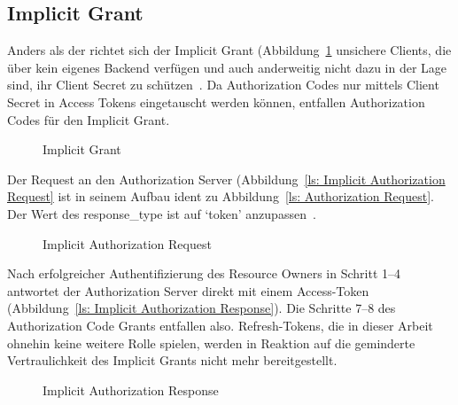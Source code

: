 \subsection{Implicit Grant}\label{ssec:implicit}
Anders als der  richtet sich der Implicit Grant
(Abbildung~\ref{fig: Implicit Grant} unsichere Clients, die über kein eigenes
Backend verfügen und auch anderweitig nicht dazu in der Lage sind, ihr Client
Secret zu schützen~. Da Authorization Codes nur
mittels Client Secret in Access Tokens eingetauscht werden können, entfallen
Authorization Codes für den Implicit Grant.
\begin{figure}[h]
    \scalebox{.5} {
        
    }
    \caption{Implicit Grant~\protect{}}\label{fig: Implicit Grant}
\end{figure} \noindent
Der Request an den Authorization Server (Abbildung~\ref{ls: Implicit
Authorization Request} ist in seinem Aufbau ident zu Abbildung~\ref{ls:
Authorization Request}. Der Wert des response\_type ist auf `token'
anzupassen~.
\begin{figure}[h]
    \scalebox{.8}{
        
    }
    \caption{Implicit Authorization
    Request~\protect{}}\label{ls: Implicit Authorization Request}
\end{figure} \noindent
Nach erfolgreicher Authentifizierung des Resource Owners in Schritt 1--4
antwortet der Authorization Server direkt mit einem Access-Token
(Abbildung~\ref{ls: Implicit Authorization Response}). Die Schritte 7--8 des
Authorization Code Grants entfallen also. Refresh-Tokens, die in dieser Arbeit
ohnehin keine weitere Rolle spielen, werden in Reaktion auf die geminderte
Vertraulichkeit des Implicit Grants nicht mehr bereitgestellt.
\begin{figure}[h]
    \scalebox{.8}{
        
    }
    \caption{Implicit Authorization
    Response~\protect{}}\label{ls: Implicit
    Authorization Response}
\end{figure}
